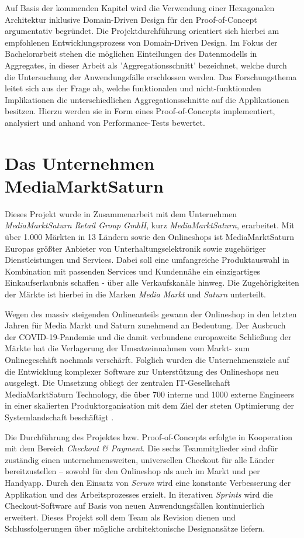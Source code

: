 Auf Basis der kommenden Kapitel wird die Verwendung einer Hexagonalen Architektur inklusive Domain-Driven Design für den Proof-of-Concept argumentativ begründet. Die Projektdurchführung orientiert sich hierbei am empfohlenen Entwicklungsprozess von Domain-Driven Design. Im Fokus der Bachelorarbeit stehen die möglichen Einteilungen des Datenmodells in Aggregates, in dieser Arbeit als 'Aggregationsschnitt' bezeichnet, welche durch die Untersuchung der Anwendungsfälle erschlossen werden. Das Forschungsthema leitet sich aus der Frage ab, welche funktionalen und nicht-funktionalen Implikationen die unterschiedlichen Aggregationsschnitte auf die Applikationen besitzen. Hierzu werden sie in Form eines Proof-of-Concepts implementiert, analysiert und anhand von Performance-Tests bewertet.

\section{Das Unternehmen MediaMarktSaturn}

Dieses Projekt wurde in Zusammenarbeit mit dem Unternehmen \emph{MediaMarktSaturn Retail Group GmbH}, kurz \emph{MediaMarktSaturn}, erarbeitet. Mit über 1.000 Märkten in 13 Ländern sowie den Onlineshops ist MediaMarktSaturn Europas größter Anbieter von Unterhaltungselektronik sowie zugehöriger Dienstleistungen und Services. Dabei soll eine umfangreiche Produktauswahl in Kombination mit passenden Services und Kundennähe ein einzigartiges Einkaufserlaubnis schaffen - über alle Verkaufskanäle hinweg. Die Zugehörigkeiten der Märkte ist hierbei in die Marken \emph{Media Markt} und \emph{Saturn} unterteilt. \cite{mms.Unternehmen}

Wegen des massiv steigenden Onlineanteils gewann der Onlineshop in den letzten Jahren für Media Markt und Saturn zunehmend an Bedeutung. Der Ausbruch der COVID-19-Pandemie und die damit verbundene europaweite Schließung der Märkte hat die Verlagerung der Umsatzeinnahmen vom Markt- zum Onlinegeschäft nochmals verschärft. Folglich wurden die Unternehmensziele auf die Entwicklung komplexer Software zur Unterstützung des Onlineshops neu ausgelegt. Die Umsetzung obliegt der zentralen IT-Gesellschaft MediaMarktSaturn Technology, die über 700 interne und 1000 externe Engineers in einer skalierten Produktorganisation mit dem Ziel der steten Optimierung der Systemlandschaft beschäftigt \cite{mms.technology}.

Die Durchführung des Projektes bzw. Proof-of-Concepts erfolgte in Kooperation mit dem Bereich \emph{Checkout \& Payment}. Die sechs Teammitglieder sind dafür zuständig einen unternehmensweiten, universellen Checkout für alle Länder bereitzustellen – sowohl für den Onlineshop als auch im Markt und per Handyapp. Durch den Einsatz von \emph{\Gls{Scrum}} wird eine konstante Verbesserung der Applikation und des Arbeitsprozesses erzielt. In iterativen \emph{\Glspl{Sprint}} wird die Checkout-Software auf Basis von neuen Anwendungsfällen kontinuierlich erweitert. Dieses Projekt soll dem Team als Revision dienen und Schlussfolgerungen über mögliche architektonische Designansätze liefern.


